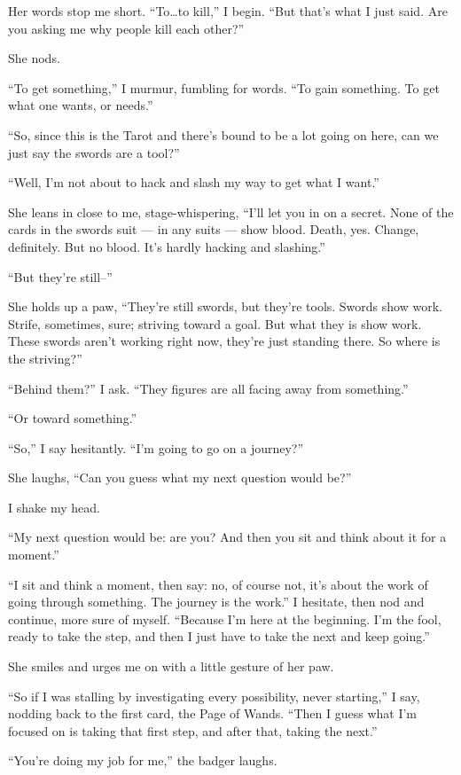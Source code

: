 Her words stop me short. ``To\ldots{}to kill,'' I begin. ``But that's
what I just said. Are you asking me why people kill each other?''

She nods.

``To get something,'' I murmur, fumbling for words. ``To gain something.
To get what one wants, or needs.''

``So, since this is the Tarot and there's bound to be a lot going on
here, can we just say the swords are a tool?''

``Well, I'm not about to hack and slash my way to get what I want.''

She leans in close to me, stage-whispering, ``I'll let you in on a
secret. None of the cards in the swords suit --- in any suits --- show
blood. Death, yes. Change, definitely. But no blood. It's hardly hacking
and slashing.''

``But they're still--''

She holds up a paw, ``They're still swords, but they're tools. Swords
show work. Strife, sometimes, sure; striving toward a goal. But what
they is show work. These swords aren't working right now, they're just
standing there. So where is the striving?''

``Behind them?'' I ask. ``They figures are all facing away from
something.''

``Or toward something.''

``So,'' I say hesitantly. ``I'm going to go on a journey?''

She laughs, ``Can you guess what my next question would be?''

I shake my head.

``My next question would be: are you? And then you sit and think about
it for a moment.''

``I sit and think a moment, then say: no, of course not, it's about the
work of going through something. The journey is the work.'' I hesitate,
then nod and continue, more sure of myself. ``Because I'm here at the
beginning. I'm the fool, ready to take the step, and then I just have to
take the next and keep going.''

She smiles and urges me on with a little gesture of her paw.

``So if I was stalling by investigating every possibility, never
starting,'' I say, nodding back to the first card, the Page of Wands.
``Then I guess what I'm focused on is taking that first step, and after
that, taking the next.''

``You're doing my job for me,'' the badger laughs.

